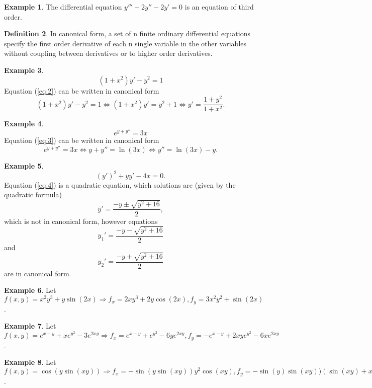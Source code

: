 \documentclass[10pt,a4paper]{article}
\theoremstyle{definition}
\newtheorem{defn}{Definition}[section]
\newtheorem{example}[defn]{Example}
\begin{document}
\begin{example}
The differential equation $y''' + 2 y'' - 2 y' = 0$ is an equation of third
order. 
\end{example}
\begin{defn}
In canonical form, a set of n finite ordinary differential equations specify
the first order derivative of each n single variable in the other variables
without coupling between derivatives or to higher order derivatives.
\end{defn}
\begin{example}
\begin{equation} \label{eq:2}
  (1 + x^2) y' - y^2 = 1 
\end{equation}
Equation (\ref{eq:2}) can be written in canonical form
\[
  (1 + x^2) y' - y^2 = 1 \Leftrightarrow (1 + x^2) y' = y^2 + 1 \Leftrightarrow
  y' = \frac{1 + y^2}{1 + x^2}.
\]
\end{example}
\begin{example}
\begin{equation} \label{eq:3}
  e^{y + y''} = 3 x
\end{equation}
Equation (\ref{eq:3}) can be written in canonical form
\[
  e^{y + y''} = 3 x \Leftrightarrow y + y'' = \ln (3 x) \Leftrightarrow y'' =
  \ln (3 x) - y.
\]
\end{example}
\begin{example}
\begin{equation} \label{eq:4}
  (y')^2 + yy' - 4 x = 0.
\end{equation}
Equation (\ref{eq:4}) is a quadratic equation, which solutions are (given by
the quadratic formula)
\begin{equation} \label{eq:3}
  y' = \frac{-y \pm \sqrt{y^2 + 16}} {2},
\end{equation}
which is not in canonical form, however equations 
\[
  y_1' = \frac{-y - \sqrt{y^2 + 16}} {2}
\]
and
\[
  y_2' = \frac{-y + \sqrt{y^2 + 16}} {2}
\]
are in canonical form.
\end{example}
\begin{example}
Let $f(x, y) = x^2 y^3 + y \sin (2 x) \Rightarrow f_x = 2 x y^3 + 2 y \cos (2
x), f_y = 3 x^2 y^2 + \sin (2 x)$.
\end{example}
\begin{example}
Let $f(x, y) = e^{x - y} + x e^{y^2} - 3 e^{2 x y} \Rightarrow f_x = e^{x-y} +
e^{y^2} - 6 y e^{2 x y}, f_y = -e^{x - y} + 2 x y e^{y^2} - 6 x e^{2 x y}$.
\end{example}
\begin{example}
Let $f(x, y) = \cos(y \sin(xy)) \Rightarrow f_x = -\sin(y \sin(x y)) y^2 \cos(x
y), f_y = -\sin(y) \sin(x y)) (\sin(x y) + x y \cos(x y))$.
\end{example}
\end{document}

